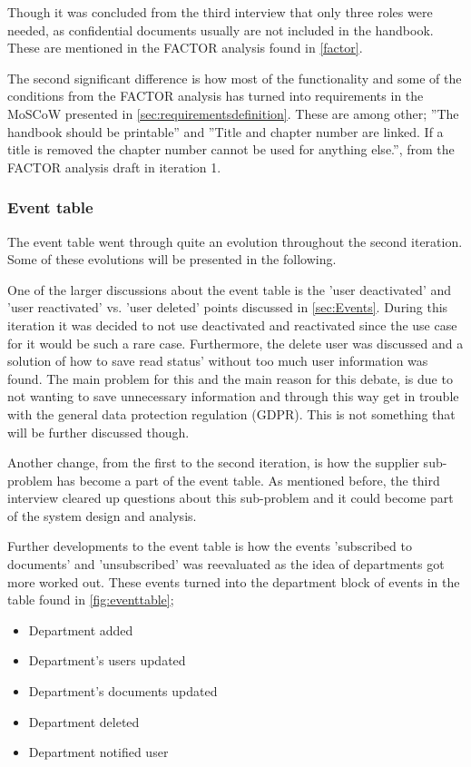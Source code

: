 Though it was concluded from the third interview that only three roles were needed, as confidential documents usually are not included in the handbook.
These are mentioned in the FACTOR analysis found in \cref{factor}.

The second significant difference is how most of the functionality and some of the conditions from the FACTOR analysis has turned into requirements in the MoSCoW presented in \cref{sec:requirementsdefinition}. 
These are among other; ''The handbook should be printable'' and ''Title and chapter number are linked.
If a title is removed the chapter number cannot be used for anything else.'', from the FACTOR analysis draft in iteration 1.

\subsubsection*{Event table}
The event table went through quite an evolution throughout the second iteration.
Some of these evolutions will be presented in the following.

One of the larger discussions about the event table is the 'user deactivated' and 'user reactivated' vs. 'user deleted' points discussed in \cref{sec:Events}.
During this iteration it was decided to not use deactivated and reactivated since the use case for it would be such a rare case.
Furthermore, the delete user was discussed and a solution of how to save read status' without too much user information was found.
The main problem for this and the main reason for this debate, is due to not wanting to save unnecessary information and through this way get in trouble with the general data protection regulation (GDPR).
This is not something that will be further discussed though.

Another change, from the first to the second iteration, is how the supplier sub-problem has become a part of the event table.
As mentioned before, the third interview cleared up questions about this sub-problem and it could become part of the system design and analysis.

Further developments to the event table is how the events 'subscribed to documents' and 'unsubscribed' was reevaluated as the idea of departments got more worked out.
These events turned into the department block of events in the table found in \cref{fig:eventtable};
\begin{itemize}
	\item 
	Department added
	\item
	Department's users updated
	\item
	Department's documents updated
	\item
	Department deleted
	\item
	Department notified user
\end{itemize} 

